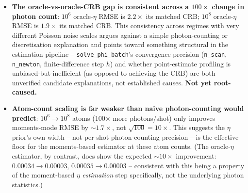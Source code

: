 \documentclass[11pt,a4paper]{article}
\begin{document}
\begin{itemize}
\item \textbf{The oracle-vs-oracle-CRB gap is consistent across a
$100\times$ change in photon count}: $10^6$ oracle-$\eta$ RMSE is
$2.2\times$ its matched CRB; $10^8$ oracle-$\eta$ RMSE is $1.9\times$ its
matched CRB. This consistency across regimes with very different Poisson
noise scales argues against a simple photon-counting or discretisation
explanation and points toward something structural in the estimation
pipeline -- \texttt{solve\_phi\_batch}'s convergence precision
(\texttt{n\_scan}, \texttt{n\_newton}, finite-difference step $h$) and
whether point-estimate profiling is unbiased-but-inefficient (as opposed to
achieving the CRB) are both unverified candidate explanations, not
established causes. \textbf{Not yet root-caused.}
\item \textbf{Atom-count scaling is far weaker than naive photon-counting
would predict}: $10^6\to10^8$ atoms (100$\times$ more photons/shot) only
improves moments-mode RMSE by $\sim\!1.7\times$, not
$\sqrt{100}=10\times$. This suggests the $\eta$ prior's own width -- not
per-shot photon-counting precision -- is the effective floor for the
moments-based estimator at these atom counts. (The oracle-$\eta$ estimator,
by contrast, does show the expected $\sim\!10\times$ improvement:
$0.00034\to0.00003$, $0.00035\to0.00003$ -- consistent with this being a
property of the moment-based $\eta$ \emph{estimation} step specifically,
not the underlying photon statistics.)
\end{itemize}
\end{document}
